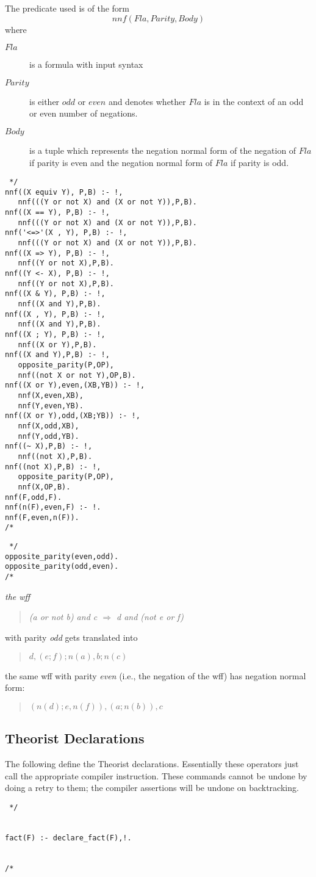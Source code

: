 The predicate used is of the form
\[nnf(Fla,Parity,Body)\]
where
\begin{description}
\item[$Fla$] is a formula with input syntax
\item[$Parity$] is either $odd$ or $even$ and denotes whether $Fla$ is
in the context of an odd or even number of negations.
\item[$Body$] is a tuple which represents the negation normal form
of the negation of $Fla$
if parity is even and the negation normal form of $Fla$ if parity is odd. 
\end{description}
\begin{verbatim} */
nnf((X equiv Y), P,B) :- !,
   nnf(((Y or not X) and (X or not Y)),P,B).
nnf((X == Y), P,B) :- !,
   nnf(((Y or not X) and (X or not Y)),P,B).
nnf('<=>'(X , Y), P,B) :- !,
   nnf(((Y or not X) and (X or not Y)),P,B).
nnf((X => Y), P,B) :- !,
   nnf((Y or not X),P,B).
nnf((Y <- X), P,B) :- !,
   nnf((Y or not X),P,B).
nnf((X & Y), P,B) :- !,
   nnf((X and Y),P,B).
nnf((X , Y), P,B) :- !,
   nnf((X and Y),P,B).
nnf((X ; Y), P,B) :- !,
   nnf((X or Y),P,B).
nnf((X and Y),P,B) :- !,
   opposite_parity(P,OP),
   nnf((not X or not Y),OP,B).
nnf((X or Y),even,(XB,YB)) :- !,
   nnf(X,even,XB),
   nnf(Y,even,YB).
nnf((X or Y),odd,(XB;YB)) :- !,
   nnf(X,odd,XB),
   nnf(Y,odd,YB).
nnf((~ X),P,B) :- !,
   nnf((not X),P,B).
nnf((not X),P,B) :- !,
   opposite_parity(P,OP),
   nnf(X,OP,B).
nnf(F,odd,F).
nnf(n(F),even,F) :- !.
nnf(F,even,n(F)).
/* \end{verbatim}
\begin{verbatim} */
opposite_parity(even,odd).
opposite_parity(odd,even).
/* \end{verbatim}

\begin{example} \em
the wff
\begin{quote} \em
(a or not b) and c $\Rightarrow$ d and (not e or f)
\end{quote}
with parity {\em odd} gets translated into
\begin{quote}
$d,(e;f);n(a),b;n(c) $
\end{quote}
the same wff with parity {\em even} (i.e., the negation of the wff)
has negation normal form:
\begin{quote}
$(n(d);e,n(f)),(a;n(b)),c$
\end{quote}
\end{example}

\subsection{Theorist Declarations}
The following define the Theorist declarations.
Essentially these operators just call the appropriate compiler
instruction. These commands cannot be undone by doing a retry to them;
the compiler assertions will be undone on backtracking.
\begin{verbatim} */


fact(F) :- declare_fact(F),!.


/* \end{verbatim}


